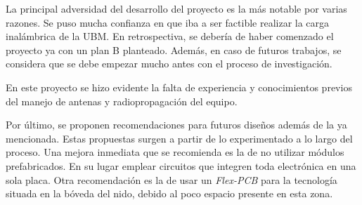La principal adversidad del desarrollo del proyecto es la más notable por varias razones. Se puso mucha confianza en que iba a ser factible realizar la carga inalámbrica de la UBM. En retrospectiva, se debería de haber comenzado el proyecto ya con un plan B planteado. Además, en caso de futuros trabajos, se considera que se debe empezar mucho antes con el proceso de investigación. 

En este proyecto se hizo evidente la falta de experiencia y conocimientos previos del manejo de antenas y radiopropagación del equipo.%

Por último, se proponen recomendaciones para futuros diseños además de la ya mencionada. Estas propuestas surgen a partir de lo experimentado a lo largo del proceso. Una mejora inmediata que se recomienda es la de no utilizar módulos prefabricados. En su lugar emplear circuitos que integren toda electrónica en una sola placa. Otra recomendación es la de usar un \textit{Flex-PCB} para la tecnología situada en la bóveda del nido, debido al poco espacio presente en esta zona.
